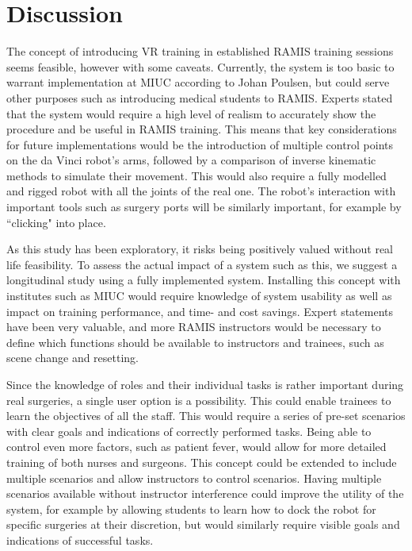 \section{Discussion}

The concept of introducing VR training in established RAMIS training sessions seems feasible, however with some caveats. Currently, the system is too basic to warrant implementation at MIUC according to Johan Poulsen, but could serve other purposes such as introducing medical students to RAMIS. Experts stated that the system would require a high level of realism to accurately show the procedure and be useful in RAMIS training. This means that key considerations for future implementations would be the introduction of multiple control points on the da Vinci robot's arms, followed by a comparison of inverse kinematic methods to simulate their movement. This would also require a fully modelled and rigged robot with all the joints of the real one. The robot's interaction with important tools such as surgery ports will be similarly important, for example by ``clicking" into place. 

As this study has been exploratory, it risks being positively valued without real life feasibility. To assess the actual impact of a system such as this, we suggest a longitudinal study using a fully implemented system. Installing this concept with institutes such as MIUC would require knowledge of system usability as well as impact on training performance, and time- and cost savings. Expert statements have been very valuable, and more RAMIS instructors would be necessary to define which functions should be available to instructors and trainees, such as scene change and resetting. 

Since the knowledge of roles and their individual tasks is rather important during real surgeries, a single user option is a possibility. This could enable trainees to learn the objectives of all the staff. This would require a series of pre-set scenarios with clear goals and indications of correctly performed tasks. Being able to control even more factors, such as patient fever, would allow for more detailed training of both nurses and surgeons. This concept could be extended to include multiple scenarios and allow instructors to control scenarios. Having multiple scenarios available without instructor interference could improve the utility of the system, for example by allowing students to learn how to dock the robot for specific surgeries at their discretion, but would similarly require visible goals and indications of successful tasks.

